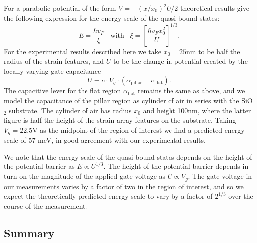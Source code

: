 \documentclass[edeposit,fullpage,draftthesis]{uiucthesis2009}
\begin{document}
            For a parabolic potential of the form $V = − (x/x_0)^2 U/2$
            theoretical results \cite{silvestrov2007quantum} give the following expression for the energy scale of the
            quasi-bound states:
            \begin{equation}
                E = \frac{\hbar v_F}{\xi} \;\;\; \text{with} \;\;\; \xi = \left[ \frac{\hbar v_F x_0^2}{U} \right]^{1/3}.
            \end{equation}
            For the experimental results described here we take $x_0=25\text{nm}$ to be half the radius of the
            strain features, and $U$ to be the change in potential created by the locally varying gate capacitance
            \begin{equation}
                U = e \cdot V_g \cdot (\alpha_\text{pillar} - \alpha_\text{flat}).
            \end{equation}
            The capacitive lever for the flat region $\alpha_\text{flat}$ remains the same as above, and we model
            the capacitance of the pillar region as cylinder of air in series with the SiO$_2$ substrate.
            The cylinder of air has radius $x_0$ and height 100nm, where the latter figure
            is half the height of the strain array features on the substrate. Taking $V_g = 22.5\text{V}$ 
            as the midpoint of the region of interest we find a predicted energy scale of 57 meV, in
            good agreement with our experimental results.
            
            We note that the energy scale of the quasi-bound states depends on the height of the 
            potential barrier as $E \propto U^{1/3} $. The height of the potential barrier depends 
            in turn on the magnitude of the applied gate voltage as $ U \propto V_g$. 
            The gate voltage in our measurements varies by a factor of two in the region of interest,
            and so we expect the theoretically predicted energy scale to vary by a factor of $2^{1/3}$
            over the course of the measurement.
            
            
    \subsection{Summary}
    
\end{document}
